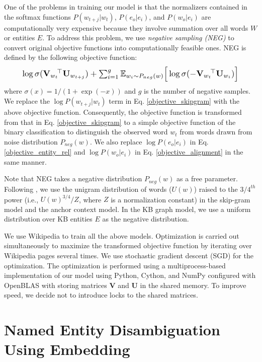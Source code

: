 \documentclass[11pt,letterpaper]{article}
\begin{document}
One of the problems in training our model is that the normalizers contained in the softmax functions $P(w_{t+j}|w_t)$, $P(e_o|e_i)$, and $P(w_o|e_i)$ are computationally very expensive because they involve summation over all words $W$ or entities $E$.
To address this problem, we use \textit{negative sampling (NEG)} \cite{Mikolov2013a} to convert original objective functions into computationally feasible ones.
NEG is defined by the following objective function:
\begin{equation}
\resizebox{.89\hsize}{!}{$
\log\sigma(\mathbf{V}_{w_t} \!^\top \mathbf{U}_{w_{t+j}}) + \sum_{i=1}^{g}\mathbb{E}_{w_i \sim P_{neg}(w)} \Big[\log\sigma(-\mathbf{V}_{w_t} \!^\top \mathbf{U}_{w_i})\Big]
$}
\end{equation}
where $\sigma(x) = 1/(1 + \exp(-x))$ and $g$ is the number of negative samples.
We replace the $\log P(w_{t+j}|w_t)$ term in Eq. \eqref{objective_skipgram} with the above objective function.
Consequently, the objective function is transformed from that in Eq. \eqref{objective_skipgram} to a simple objective function of the binary classification to distinguish the observed word $w_t$ from words drawn from noise distribution $P_{neg}(w)$.
We also replace $\log P(e_o|e_i)$ in Eq. \eqref{objective_entity_rel} and $\log P(w_o|e_i)$ in Eq. \eqref{objective_alignment} in the same manner.

Note that NEG takes a negative distribution $P_{neg}(w)$ as a free parameter.
Following \cite{Mikolov2013a}, we use the unigram distribution of words ($U(w)$) raised to the $3/4^{th}$ power (i.e., $U(w)^{3/4}/Z$, where $Z$ is a normalization constant) in the skip-gram model and the anchor context model.
In the KB graph model, we use a uniform distribution over KB entities $E$ as the negative distribution.

We use Wikipedia to train all the above models.
Optimization is carried out simultaneously to maximize the transformed objective function by iterating over Wikipedia pages several times.
We use stochastic gradient descent (SGD) for the optimization.
The optimization is performed using a multiprocess-based implementation of our model using Python, Cython, and NumPy configured with OpenBLAS with storing matrices $\mathbf{V}$ and $\mathbf{U}$ in the shared memory.
To improve speed, we decide not to introduce locks to the shared matrices.

\section{Named Entity Disambiguation Using Embedding}
\end{document}
